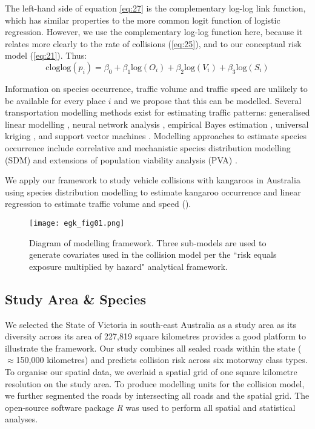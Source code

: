 The left-hand side of equation \ref{eq:27} is the complementary log-log link function, which has similar properties to the more common logit function of logistic regression. However, we use the complementary log-log function here, because it relates more clearly to the rate of collisions (\ref{eq:25}), and to our conceptual risk model (\ref{eq:21}). Thus: 
\begin{equation} \label{eq:28}
\text{cloglog}(p_i)=\beta_0+\beta_1\text{log}(O_i)+\beta_2\text{log}(V_i)+\beta_3\text{log}(S_i)
\end{equation}

Information on species occurrence, traffic volume and traffic speed are unlikely to be available for every place $i$ and we propose that this can be modelled. Several transportation modelling methods exist for estimating traffic patterns: generalised linear modelling \citep[e.g.][]{seav00,zhao01}, neural network analysis \citep[e.g.][]{dudd13}, empirical Bayes estimation \citep[e.g.][]{yang02}, universal kriging \citep[e.g.][]{eom06,selb13}, and support vector machines \citep[e.g.][]{cast09}. Modelling approaches to estimate species occurrence include correlative \citep[e.g.][]{guis05,elit09} and mechanistic \citep[e.g.][]{kear09} species distribution modelling (SDM) and extensions of population viability analysis (PVA) \citep[e.g.][]{gilp86,shaf90}.

We apply our framework to study vehicle collisions with kangaroos in Australia using species distribution modelling to estimate kangaroo occurrence and linear regression to estimate traffic volume and speed ().

\begin{figure*}[!t]
  \centering
  \texttt{[image: egk\_fig01.png]}
  \caption[Diagram of modelling framework]{Diagram of modelling framework. Three sub-models are used to generate covariates used in the collision model per the ``risk equals exposure multiplied by hazard" analytical framework.}
  \label{egk_framework}
\end{figure*}
 
\subsection{Study Area \& Species}

We selected the State of Victoria in south-east Australia as a study area as its diversity across its area of 227,819 square kilometres provides a good platform to illustrate the framework. Our study combines all sealed roads within the state ($\approx$150,000 kilometres) and predicts collision risk across six motorway class types. To organise our spatial data, we overlaid a spatial grid of one square kilometre resolution on the study area. To produce modelling units for the collision model, we further segmented the roads by intersecting all roads and the spatial grid. The open-source software package \textit{R} \citep{rdct16} was used to perform all spatial and statistical analyses.


